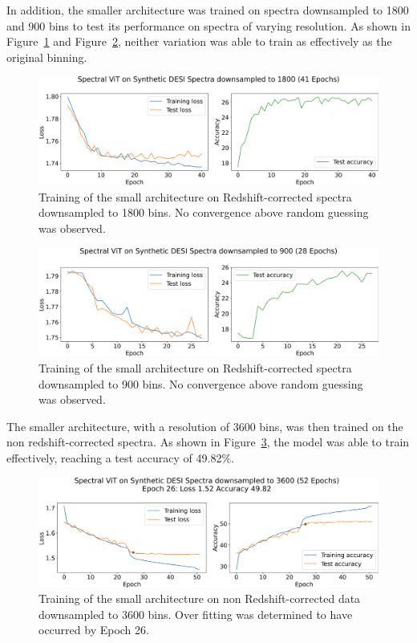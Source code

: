 In addition, the smaller architecture was trained on spectra downsampled to 1800 and 900 bins to test 
its performance on spectra of varying resolution. As shown in Figure~\ref{fig:vit1.2_training} and Figure~\ref{fig:vit1.3_training},
neither variation was able to train as effectively as the original binning. 
\begin{figure}
    \centering
    \includegraphics[width=.8\linewidth]{figures/vit_model_V1.2training_new.png}
    \caption{Training of the small architecture on Redshift-corrected spectra downsampled to 1800 bins. No convergence above random guessing was observed. }
    \label{fig:vit1.2_training}
\end{figure}

\begin{figure}
    \centering
    \includegraphics[width=.8\linewidth]{figures/vit_model_V1.3_muchsmallermodeltraining_new.png}
    \caption{Training of the small architecture on Redshift-corrected spectra downsampled to 900 bins. No convergence above random guessing was observed. }
    \label{fig:vit1.3_training}
\end{figure}

The smaller architecture, with a resolution of 3600 bins, was then trained on the non redshift-corrected spectra. 
As shown in Figure~\ref{fig:vit2_training}, the model was able to train effectively, reaching a test accuracy of 49.82\%. 


\begin{figure}
    \centering
    \includegraphics[width=.8\linewidth]{figures/v2_real/vit_model_V2training_new.png}
    \caption{Training of the small architecture on non Redshift-corrected data downsampled to 3600 bins. Over fitting was determined to have occurred by Epoch 26.}
    \label{fig:vit2_training}
\end{figure}
